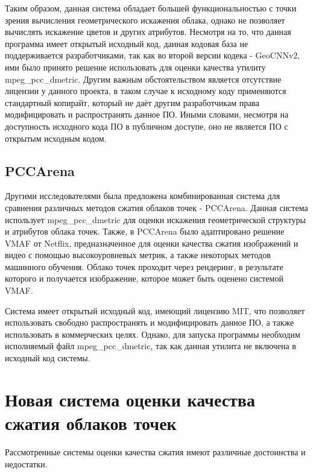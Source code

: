 
Таким образом, данная система обладает большей функциональностью с точки зрения
вычисления геометрического искажения облака, однако не позволяет вычислять
искажение цветов и других атрибутов. Несмотря на то, что данная программа имеет
открытый исходный код, данная кодовая база не поддерживается разработчиками, так
как во второй версии кодека - GeoCNNv2\cite{GeoCNNv2}, ими было принято решение
использовать для оценки качества утилиту mpeg\_pcc\_dmetric. Другим важным
обстоятельством является отсутствие лицензии у данного проекта, в таком случае к
исходному коду применяются стандартный копирайт, который не даёт другим
разработчикам права модифицировать и распространять данное ПО. Иными словами,
несмотря на доступность исходного кода ПО в публичном доступе, оно не является
ПО с открытым исходным кодом.

\subsection{PCCArena}

Другими исследователями была предложена комбинированная система для сравнения
различных методов сжатия облаков точек - PCCArena\cite{Wu2020}. Данная система
использует mpeg\_pcc\_dmetric для оценки искажения геометрической структуры и
атрибутов облака точек. Также, в PCCArena было адаптировано решение VMAF от
Netflix, предназначенное для оценки качества сжатия изображений и видео с
помощью высокоуровневых метрик, а также некоторых методов машинного
обучения\cite{NetflixVMAFMedium}. Облако точек проходит через рендеринг, в
результате которого и получается изображение, которое может быть оценено
системой VMAF.

Система имеет открытый исходный код, имеющий лицензию MIT, что позволяет
использовать свободно распространять и модифицировать данное ПО, а также
использовать в коммерческих целях. Однако, для запуска программы необходим
исполняемый файл mpeg\_pcc\_dmetric, так как данная утилита не включена в
исходный код системы.

\section{Новая система оценки качества сжатия облаков точек}

Рассмотренные системы оценки качества сжатия имеют различные достоинства и
недостатки.

